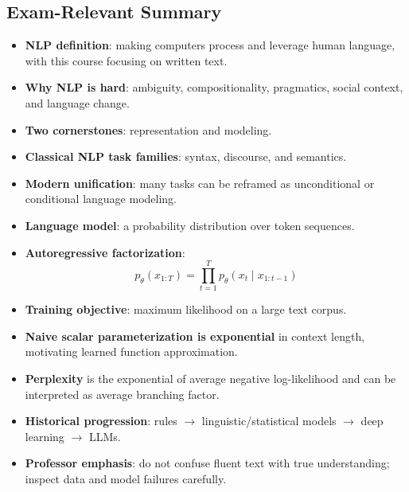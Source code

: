 \documentclass[11pt]{article}
\begin{document}
\subsection{Exam-Relevant Summary}
\begin{itemize}
    \item \textbf{NLP definition}: making computers process and leverage human language, with this course focusing on written text.
    \item \textbf{Why NLP is hard}: ambiguity, compositionality, pragmatics, social context, and language change.
    \item \textbf{Two cornerstones}: representation and modeling.
    \item \textbf{Classical NLP task families}: syntax, discourse, and semantics.
    \item \textbf{Modern unification}: many tasks can be reframed as unconditional or conditional language modeling.
    \item \textbf{Language model}: a probability distribution over token sequences.
    \item \textbf{Autoregressive factorization}:
    \[
    p_\theta(x_{1:T}) = \prod_{t=1}^{T} p_\theta(x_t \mid x_{1:t-1})
    \]
    \item \textbf{Training objective}: maximum likelihood on a large text corpus.
    \item \textbf{Naive scalar parameterization is exponential} in context length, motivating learned function approximation.
    \item \textbf{Perplexity} is the exponential of average negative log-likelihood and can be interpreted as average branching factor.
    \item \textbf{Historical progression}: rules \(\rightarrow\) linguistic/statistical models \(\rightarrow\) deep learning \(\rightarrow\) LLMs.
    \item \textbf{Professor emphasis}: do not confuse fluent text with true understanding; inspect data and model failures carefully.
\end{itemize}
\end{document}
